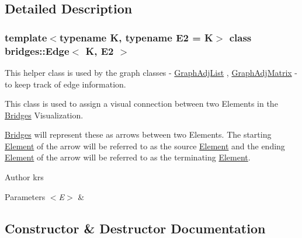 \subsection{Detailed Description}
\subsubsection*{template$<$typename K, typename E2 = K$>$\newline
class bridges\+::\+Edge$<$ K, E2 $>$}

This helper class is used by the graph classes -\/ \mbox{\hyperlink{classbridges_1_1_graph_adj_list}{Graph\+Adj\+List}} , \mbox{\hyperlink{classbridges_1_1_graph_adj_matrix}{Graph\+Adj\+Matrix}} -\/ to keep track of edge information. 

This class is used to assign a visual connection between two Elements in the \mbox{\hyperlink{classbridges_1_1_bridges}{Bridges}} Visualization. 

\mbox{\hyperlink{classbridges_1_1_bridges}{Bridges}} will represent these as arrows between two Elements. The starting \mbox{\hyperlink{classbridges_1_1_element}{Element}} of the arrow will be referred to as the source \mbox{\hyperlink{classbridges_1_1_element}{Element}} and the ending \mbox{\hyperlink{classbridges_1_1_element}{Element}} of the arrow will be referred to as the terminating \mbox{\hyperlink{classbridges_1_1_element}{Element}}.

\begin{DoxyAuthor}{Author}
krs
\end{DoxyAuthor}

\begin{DoxyParams}{Parameters}
{\em $<$\+E$>$} & \\
\hline
\end{DoxyParams}


\subsection{Constructor \& Destructor Documentation}
\mbox{\label{classbridges_1_1_edge_ad7647870c01109744f5cd0b56c356d7e}} 
